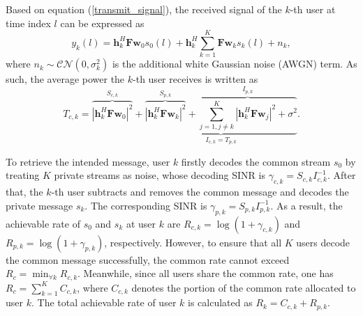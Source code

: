 \documentclass[10pt,journal,twocolumn]{IEEEtran}
\begin{document}
Based on equation (\ref{transmit_signal}), the received signal of the $k$-th user at  time index $l$ can be expressed as 
\begin{equation}
y_k\left(l\right)=\mathbf{h}^H_k\mathbf{F}\mathbf{w}_0s_0\left(l\right) + \mathbf{h}^H_k\sum_{k=1}^{K}{\mathbf{F}\mathbf{w}_ks_k\left(l\right)}+n_k,
\label{Receive_signal}
\end{equation}
where $n_k\sim \mathcal{CN}\left(0,\sigma^2_k\right)$ is the additional white Gaussian noise (AWGN) term. As such, the average power the $k$-th user receives is written as 
\begin{equation}
T_{c,k}=\overbrace{{\left|\mathbf{h}^H_{k}\mathbf{F}\mathbf{w}_0\right|}^2}^{S_{c,k}}+\underbrace{\overbrace{{\left|\mathbf{h}^H_{k}\mathbf{F}\mathbf{w}_{k}\right|}^2}^{S_{{p,k}}}+\overbrace{\sum_{j=1,j\neq k}^{K}\left|\mathbf{h}^H_{k}\mathbf{F}\mathbf{w}_j\right|^2+\sigma^2}^{I_{{p,k}}}}_{I_{c,k}=T_{p,k}}.
\label{equ:rece_power}
\end{equation}

To retrieve the intended message, user $k$ firstly decodes the common stream $s_0$ by treating $K$ private streams as noise, whose decoding SINR is $\gamma_{c,k}=S_{c,k}{I^{-1}_{c,k}}$. After that, the $k$-th user subtracts and removes the common message and decodes the private message $s_k$. The corresponding SINR is $\gamma_{{p,k}}=S_{p,k}{I^{-1}_{{p,k}}}$. As a result, the achievable rate of $s_0$ and $s_k$ at user $k$ are $R_{c,k}=\log\left(1 + \gamma_{{c,k}}\right)$ and $R_{p,k}=\log\left(1 + \gamma_{{p,k}}\right)$, respectively. However, to ensure that all $K$ users decode the common message successfully, the common rate cannot exceed $R_c= \min_{\forall k}R_{c,k}$. Meanwhile, since all users share the common rate, one has $R_c=\sum_{k=1}^{K}C_{c,k}$, where $C_{c,k}$ denotes the portion of the common rate allocated to user $k$. The total achievable rate of user $k$ is calculated as $R_k=C_{c,k}+R_{p,k}$.
\end{document}

